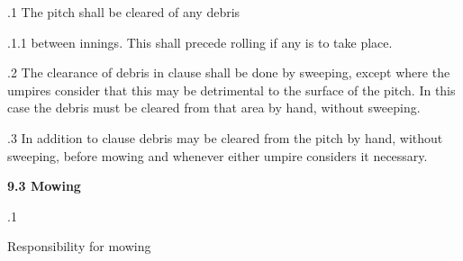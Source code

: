 \documentclass[12pt]{article}
\begin{document}
\vspace{\baselineskip}
{\fontsize{9pt}{10.8pt}.1 \tabto{0.49in} The pitch shall be cleared of any debris\par}\par


\vspace{\baselineskip}
\begin{adjustwidth}{0.49in}{0.0in}
{\fontsize{9pt}{10.8pt}.1.1 \tabto{1.17in} between innings. This shall precede rolling if any is to take place.\par}\par

\end{adjustwidth}


\vspace{\baselineskip}
\begin{adjustwidth}{0.5in}{0.08in}
\begin{justify}
{\fontsize{9pt}{10.8pt}.2 \tabto{0.49in} The clearance of debris in clause shall be done by sweeping, except where the umpires consider that this may be detrimental to the surface of the pitch. In this case the debris must be cleared from that area by hand, without sweeping.\par}
\end{justify}\par

\end{adjustwidth}


\vspace{\baselineskip}
\begin{adjustwidth}{0.5in}{0.08in}
\begin{justify}
{\fontsize{9pt}{10.8pt}.3 \tabto{0.49in} In addition to clause debris may be cleared from the pitch by hand, without sweeping, before mowing and whenever either umpire considers it necessary.\par}
\end{justify}\par

\end{adjustwidth}


\vspace{\baselineskip}
{\fontsize{11pt}{13.2pt}\selectfont \textbf{9.3 \tabto{0.47in} Mowing}\par}\par


\vspace{\baselineskip}
{\fontsize{9pt}{10.8pt}.1 \tabto{0.49in} {\fontsize{8pt}{9.6pt}\selectfont Responsibility for mowing\par}\par}\par
\end{document}
